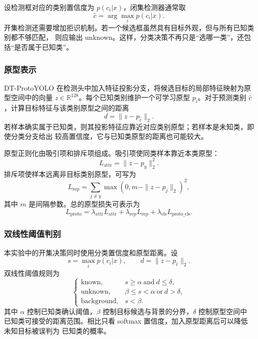 \documentclass[UTF8,a4paper,12pt]{ctexart}
\begin{document}
设检测框对应的类别置信度为 $p(c_i|x)$，闭集检测器通常取
\begin{equation}
  \hat{c}=\arg\max_i p(c_i|x).
\end{equation}
开集检测还需要增加拒识机制。若一个候选框虽然具有目标外观，但与所有已知类别都不够匹配，
则应输出 unknown。这样，分类决策不再只是“选哪一类”，还包括“是否属于已知类”。

\subsubsection{原型表示}

DT-ProtoYOLO 在检测头中加入特征投影分支，将候选目标的局部特征映射为原型空间中的向量
$z\in\mathbb{R}^{128}$。每个已知类别维护一个可学习原型 $p_i$。对于预测类别
$\hat{c}$，计算目标特征与该类别原型之间的距离
\begin{equation}
  d=\|z-p_{\hat{c}}\|_2 .
\end{equation}
若样本确实属于已知类，则其投影特征应靠近对应类别原型；若样本是未知类，即使分类分支给出
较高置信度，它与已知类原型的距离也可能较大。

原型正则化由吸引项和排斥项组成。吸引项使同类样本靠近本类原型：
\begin{equation}
  L_{\mathrm{attr}}=\|z-p_y\|_2^2 .
\end{equation}
排斥项使样本远离非目标类别原型，可写为
\begin{equation}
  L_{\mathrm{rep}}=\sum_{j\ne y}\max(0,m-\|z-p_j\|_2)^2 ,
\end{equation}
其中 $m$ 是间隔参数。总的原型损失可表示为
\begin{equation}
  L_{\mathrm{proto}}=\lambda_{\mathrm{attr}}L_{\mathrm{attr}}
  +\lambda_{\mathrm{rep}}L_{\mathrm{rep}}
  +\lambda_{\mathrm{cls}}L_{\mathrm{proto\_cls}} .
\end{equation}

\subsubsection{双线性阈值判别}

本实验中的开集决策同时使用分类置信度和原型距离。设
\begin{equation}
  s=\max_i p(c_i|x), \qquad d=\|z-p_{\hat{c}}\|_2 .
\end{equation}
双线性阈值规则为
\begin{equation}
\begin{cases}
\mathrm{known}, & s\ge \alpha \ \mathrm{and}\ d\le \delta,\\
\mathrm{unknown}, & \beta\le s<\alpha \ \mathrm{or}\ d>\delta,\\
\mathrm{background}, & s<\beta.
\end{cases}
\end{equation}
其中 $\alpha$ 控制已知类确认阈值，$\beta$ 控制目标候选与背景的分界，$\delta$ 控制原型空间中
已知类可接受的距离范围。相比只看 softmax 置信度，加入原型距离后可以降低未知目标被误判为
已知类的概率。
\end{document}
